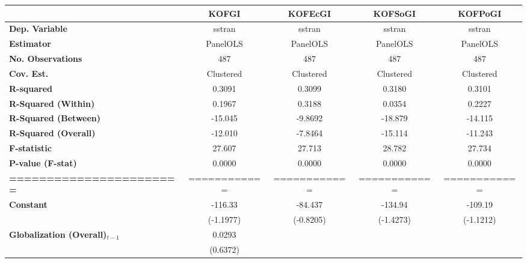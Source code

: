 \begin{center}
\begin{tabular}{lcccc}
\toprule
                                   & \textbf{KOFGI} & \textbf{KOFEcGI} & \textbf{KOFSoGI} & \textbf{KOFPoGI}  \\
\midrule
\textbf{Dep. Variable}             &     sstran     &      sstran      &      sstran      &      sstran       \\
\textbf{Estimator}                 &    PanelOLS    &     PanelOLS     &     PanelOLS     &     PanelOLS      \\
\textbf{No. Observations}          &      487       &       487        &       487        &       487         \\
\textbf{Cov. Est.}                 &   Clustered    &    Clustered     &    Clustered     &    Clustered      \\
\textbf{R-squared}                 &     0.3091     &      0.3099      &      0.3180      &      0.3101       \\
\textbf{R-Squared (Within)}        &     0.1967     &      0.3188      &      0.0354      &      0.2227       \\
\textbf{R-Squared (Between)}       &    -15.045     &     -9.8692      &     -18.879      &     -14.115       \\
\textbf{R-Squared (Overall)}       &    -12.010     &     -7.8464      &     -15.114      &     -11.243       \\
\textbf{F-statistic}               &     27.607     &      27.713      &      28.782      &      27.734       \\
\textbf{P-value (F-stat)}          &     0.0000     &      0.0000      &      0.0000      &      0.0000       \\
\textbf{=======================}   &  ============  &   ============   &   ============   &   ============    \\
\textbf{Constant}                     &    -116.33     &     -84.437      &     -134.94      &     -109.19       \\
\textbf{ }                         &   (-1.1977)    &    (-0.8205)     &    (-1.4273)     &    (-1.1212)      \\
\textbf{Globalization (Overall)$_{t-1}$}               &     0.0293     &                  &                  &                   \\
\textbf{ }                         &    (0.6372)    &                  &                  &                   \\

\end{tabular}
\end{center}

